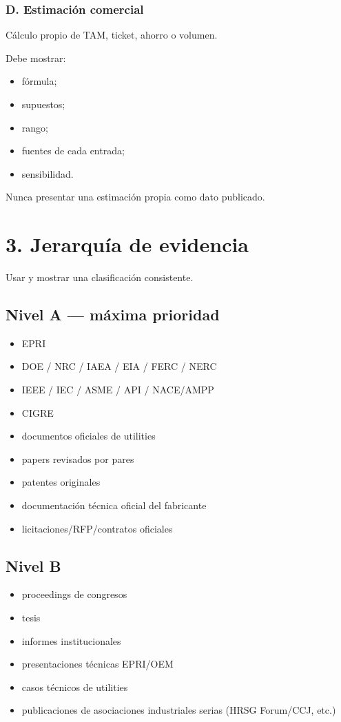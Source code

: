 \documentclass[11pt,a4paper]{article}
\begin{document}
\subsubsection*{D. Estimación comercial}
Cálculo propio de TAM, ticket, ahorro o volumen.

Debe mostrar:

\begin{itemize}
\item fórmula;
\item supuestos;
\item rango;
\item fuentes de cada entrada;
\item sensibilidad.
\end{itemize}

Nunca presentar una estimación propia como dato publicado.


\section*{3. Jerarquía de evidencia}
Usar y mostrar una clasificación consistente.


\subsection*{Nivel A — máxima prioridad}
\begin{itemize}
\item EPRI
\item DOE / NRC / IAEA / EIA / FERC / NERC
\item IEEE / IEC / ASME / API / NACE/AMPP
\item CIGRE
\item documentos oficiales de utilities
\item papers revisados por pares
\item patentes originales
\item documentación técnica oficial del fabricante
\item licitaciones/RFP/contratos oficiales
\end{itemize}


\subsection*{Nivel B}
\begin{itemize}
\item proceedings de congresos
\item tesis
\item informes institucionales
\item presentaciones técnicas EPRI/OEM
\item casos técnicos de utilities
\item publicaciones de asociaciones industriales serias (HRSG Forum/CCJ, etc.)
\end{itemize}
\end{document}
